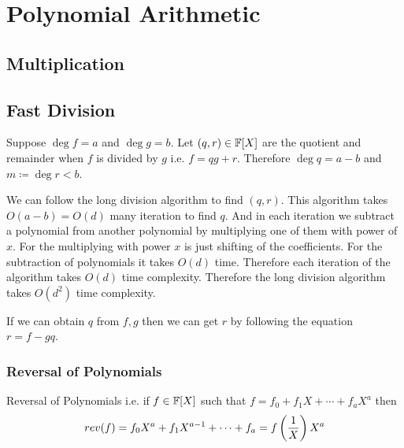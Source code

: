 \chapter{Polynomial Arithmetic}
\section{Multiplication}
\section{Fast Division}
\begin{algoprob}
\end{algoprob}

Suppose $\deg f=a$ and $\deg g=b$. Let $(q,r)\in \mathbb{F}[X]$ are the quotient and remainder when $f$ is divided by $g$ i.e. $f=qg+r$. Therefore $\deg q=a-b$ and $m\coloneqq \deg r<b$. 

We can follow the long division algorithm to find $(q,r)$. This algorithm takes $O(a-b)=O(d)$ many iteration to find $q$. And in each iteration we subtract a polynomial from another polynomial by multiplying one of them with power of $x$. For the multiplying with power $x$ is just shifting of the coefficients. For the subtraction of polynomials it takes $O(d)$ time. Therefore each iteration of the algorithm takes $O(d)$ time complexity. Therefore the long division algorithm takes $O(d^2)$ time complexity. 

If we can obtain $q$ from $f,g$ then we can get $r$ by following the equation $r=f-gq$.  
\subsection{Reversal of Polynomials}
\begin{idea*}
	Reversal of Polynomials i.e. if $f\in \mathbb{F}[X]$ such that $f=f_0+f_1X+\cdots+f_aX^a$ then $$rev(f)=f_0X^a+f_1X^{a-1}+\cdots+f_a=f\left(\frac1X\right)X^a$$
\end{idea*}

